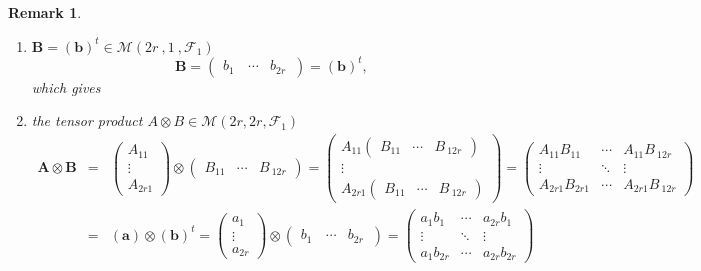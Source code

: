 \documentclass[aps,preprint]{revtex4}
\newtheorem{remark}[theorem]{Remark}
\begin{document}
\begin{remark}
\begin{enumerate}
\begin{enumerate}
\item $\boldsymbol{B}=\left( \boldsymbol{b}\right) ^{t}\in \mathcal{M}\left(
2r\ ,1\ ,\mathcal{F}_{1}\right) $ 
\begin{equation}
\boldsymbol{B}=\left( 
\begin{array}{ccc}
b_{1\ } & \cdots & b_{2r\ }%
\end{array}%
\right) =\left( \boldsymbol{b}\right) ^{t},
\end{equation}%
which gives

\item the tensor product $A\otimes B\in \mathcal{M}\left( 2r,2r,\mathcal{F}%
_{1}\right) $ 
\begin{eqnarray}
\boldsymbol{A}\otimes \boldsymbol{B} &=&\left( 
\begin{array}{c}
A_{11} \\ 
\vdots \\ 
A_{2r1}%
\end{array}%
\right) \otimes \left( 
\begin{array}{ccc}
B_{11} & \cdots & B_{\ 12r}%
\end{array}%
\right) =\left( 
\begin{array}{c}
A_{11}\left( 
\begin{array}{ccc}
B_{11} & \cdots & B_{\ 12r}%
\end{array}%
\right) \\ 
\vdots \\ 
A_{2r1}\left( 
\begin{array}{ccc}
B_{11} & \cdots & B_{\ 12r}%
\end{array}%
\right)%
\end{array}%
\right) =\left( 
\begin{array}{ccc}
A_{11}B_{11} & \cdots & A_{11}B_{\ 12r} \\ 
\vdots & \ddots & \vdots \\ 
A_{2r1}B_{2r1} & \cdots & A_{2r1}B_{\ 12r}%
\end{array}%
\right) \\
&=&\left( \boldsymbol{a}\right) \otimes \left( \boldsymbol{b}\right)
^{t}=\left( 
\begin{array}{c}
a_{1} \\ 
\vdots \\ 
a_{2r}%
\end{array}%
\right) \otimes \left( 
\begin{array}{ccc}
b_{1\ } & \cdots & b_{2r\ }%
\end{array}%
\right) =\left( 
\begin{array}{ccc}
a_{1}b_{1} & \cdots & a_{2r}b_{1} \\ 
\vdots & \ddots & \vdots \\ 
a_{1}b_{2r} & \cdots & a_{2r}b_{2r}%
\end{array}%
\right)
\end{eqnarray}


\end{enumerate}
\end{enumerate}
\end{remark}
\end{document}

